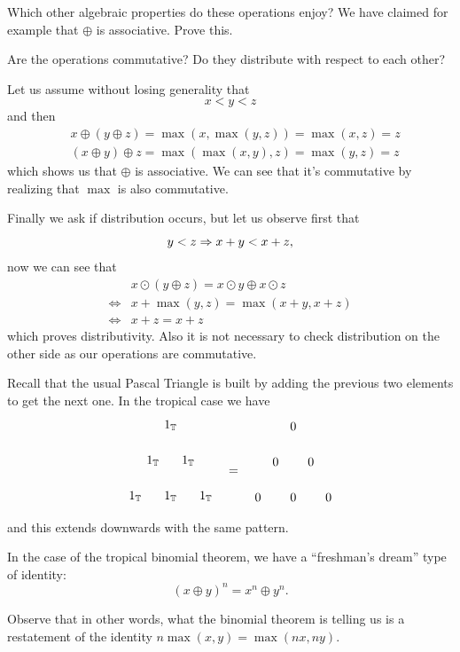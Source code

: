 \documentclass[12pt]{memoir}
\begin{document}
\begin{Ej}[2-]
Which other algebraic properties do these operations enjoy? We have claimed for example that $\oplus$ is associative. Prove this.\par 
Are the operations commutative? Do they distribute with respect to each other?
\end{Ej}

\begin{ptcb}
Let us assume without losing generality that 
$$x<y<z$$
and then 
\begin{align*}
    &x\oplus (y\oplus z)=\max(x,\max(y,z))=\max(x,z)=z\\
    &(x\oplus y)\oplus z=\max(\max(x,y),z)=\max(y,z)=z
\end{align*}
which shows us that $\oplus$ is associative. We can see that it's commutative by realizing that $\max$ is also commutative.\par 
Finally we ask if distribution occurs, but let us observe first that 
$$y<z\Rightarrow x+y<x+z,$$
now we can see that 
\begin{align*}
&x\odot(y\oplus z)=x\odot y\oplus x\odot z\\
\iff &x+\max(y,z)=\max(x+y,x+z)\\
\iff &x+z=x+z
\end{align*}
which proves distributivity. Also it is not necessary to check distribution on the other side as our operations are commutative.
\end{ptcb}

\begin{Prop}
Recall that the usual Pascal Triangle is built by adding the previous two elements to get the next one. In the tropical case we have 
$$
\begin{tikzpicture}
    \foreach \n in {0,...,2} {
      \foreach \k in {0,...,\n} {
        \node at (\k-\n/2,-\n) {$1_\bT$};
      }
    }
    \end{tikzpicture}
    \word{\raisebox{2.5em}{=}}%
    \begin{tikzpicture}
        \foreach \n in {0,...,2} {
          \foreach \k in {0,...,\n} {
            \node at (\k-\n/2,-\n) {$0$};
          }
        }
        \end{tikzpicture}
    $$
    and this extends downwards with the same pattern.\par 
    In the case of the tropical binomial theorem, we have a ``freshman's dream'' type of identity:
    $$(x\oplus y)^n=x^n\oplus y^n.$$

Observe that in other words, what the binomial theorem is telling us is a restatement of the identity $n\max(x,y)=\max(nx,ny)$.
\end{Prop}
\end{document}
